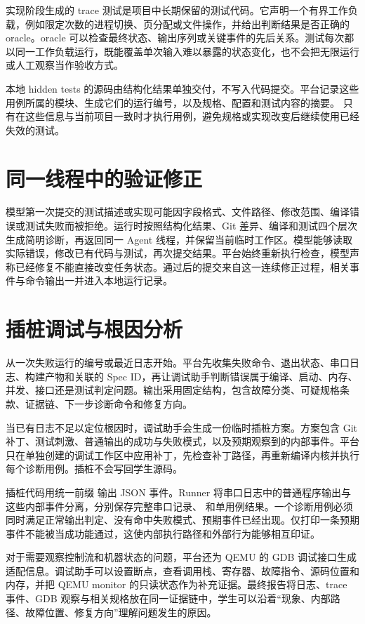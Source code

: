 实现阶段生成的 trace 测试是项目中长期保留的测试代码。它声明一个有界工作负载，例如限定次数的进程切换、页分配或文件操作，并给出判断结果是否正确的 oracle。oracle 可以检查最终状态、输出序列或关键事件的先后关系。测试每次都以同一工作负载运行，既能覆盖单次输入难以暴露的状态变化，也不会把无限运行或人工观察当作验收方式。

本地 hidden tests 的源码由结构化结果单独交付，不写入代码提交。平台记录这些用例所属的模块、生成它们的运行编号，以及规格、配置和测试内容的摘要。 只有在这些信息与当前项目一致时才执行用例，避免规格或实现改变后继续使用已经失效的测试。

\section{同一线程中的验证修正}

模型第一次提交的测试描述或实现可能因字段格式、文件路径、修改范围、编译错误或测试失败而被拒绝。运行时按照结构化结果、Git 差异、编译和测试四个层次生成简明诊断，再返回同一 Agent 线程，并保留当前临时工作区。模型能够读取实际错误，修改已有代码与测试，再次提交结果。平台始终重新执行检查，模型声称已经修复不能直接改变任务状态。通过后的提交来自这一连续修正过程，相关事件与命令输出一并进入本地运行记录。

\section{插桩调试与根因分析}

 从一次失败运行的编号或最近日志开始。平台先收集失败命令、退出状态、串口日志、构建产物和关联的 Spec ID，再让调试助手判断错误属于编译、启动、内存、并发、接口还是测试判定问题。输出采用固定结构，包含故障分类、可疑规格条款、证据链、下一步诊断命令和修复方向。

当已有日志不足以定位根因时，调试助手会生成一份临时插桩方案。方案包含 Git 补丁、测试刺激、普通输出的成功与失败模式，以及预期观察到的内部事件。平台只在单独创建的调试工作区中应用补丁，先检查补丁路径，再重新编译内核并执行每个诊断用例。插桩不会写回学生源码。

插桩代码用统一前缀  输出 JSON 事件。Runner 将串口日志中的普通程序输出与这些内部事件分离，分别保存完整串口记录、 和单用例结果。一个诊断用例必须同时满足正常输出判定、没有命中失败模式、预期事件已经出现。仅打印一条预期事件不能被当成功能通过，这使内部执行路径和外部行为能够相互印证。

对于需要观察控制流和机器状态的问题，平台还为 QEMU 的 GDB 调试接口生成适配信息。调试助手可以设置断点，查看调用栈、寄存器、故障指令、源码位置和内存，并把 QEMU monitor 的只读状态作为补充证据。最终报告将日志、trace 事件、GDB 观察与相关规格放在同一证据链中，学生可以沿着``现象、内部路径、故障位置、修复方向''理解问题发生的原因。

